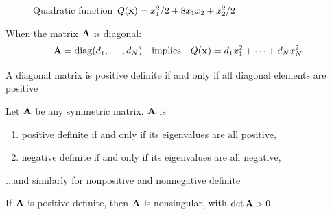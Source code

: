 \begin{frame}

     \vspace{2em}
    \begin{figure}
   \begin{center}
    \caption{\label{f:qform_indef} Quadratic function $Q({\mathbf x}) = x_1^2/2 +
        8 x_1 x_2 + x_2^2/2$ }
   \end{center}
    \end{figure}
    
\end{frame}

\begin{frame}  

   \vspace{2em}
   When the matrix $\mathbf A$ is diagonal: 
    \begin{equation*}
        \mathbf A = \operatorname{diag}(d_1, \ldots, d_N)
        \quad \text{implies} \quad
        Q({\mathbf x}) = d_1 x_1^2 + \cdots + d_N x_N^2  
    \end{equation*}
    
    
    \vspace{.7em}
    A diagonal matrix is positive definite if and only if all diagonal elements are positive 
    
\end{frame}

\begin{frame}

    \vspace{2em}
    \Fact{\eqref{ET-fa:eigdef}}
    Let $\mathbf A$ be any symmetric matrix.  $\mathbf A$ is 
    \begin{enumerate}
        \item positive definite if and only if its eigenvalues are all positive,
        \item negative definite if and only if its eigenvalues are all negative,
    \end{enumerate}
    ...and similarly for nonpositive and nonnegative definite
    
    \vspace{.7em}
    \Fact{\eqref{ET-fa:ipde}}
        If $\mathbf A$ is positive definite, then $\mathbf A$ is nonsingular, with $\det \mathbf A > 0$

\end{frame}

